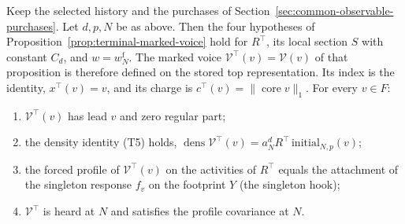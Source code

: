 \begin{proposition}
\label{prop:selected-terminal-voice}
Keep the selected history and the purchases of
Section~\ref{sec:common-observable-purchases}. Let $d,p,N$ be as above.
Then the four hypotheses of Proposition~\ref{prop:terminal-marked-voice}
hold for $R^\top$, its local section $S$ with constant $C_d$, and
$w=w^{\mathrm f}_N$. The marked voice
$\mathcal V^\top(v)=\mathcal V(v)$ of that proposition is therefore
defined on the stored top representation. Its index is the identity,
$x^\top(v)=v$, and its charge is $c^\top(v)=\|\operatorname{core}v\|_1$.
For every $v\in F$:
\begin{enumerate}
\item $\mathcal V^\top(v)$ has lead $v$ and zero regular part;
\item the density identity (T5) holds,
  $\operatorname{dens}\mathcal V^\top(v)=a_N^dR^\top\,
  \mathrm{initial}_{N,p}(v)$;
\item the forced profile of $\mathcal V^\top(v)$ on the activities of
  $R^\top$ equals the attachment of the singleton response $f_v$ on the
  footprint $Y$ (the singleton hook);
\item $\mathcal V^\top$ is heard at $N$ and satisfies the profile
  covariance at $N$.
\end{enumerate}
\end{proposition}

